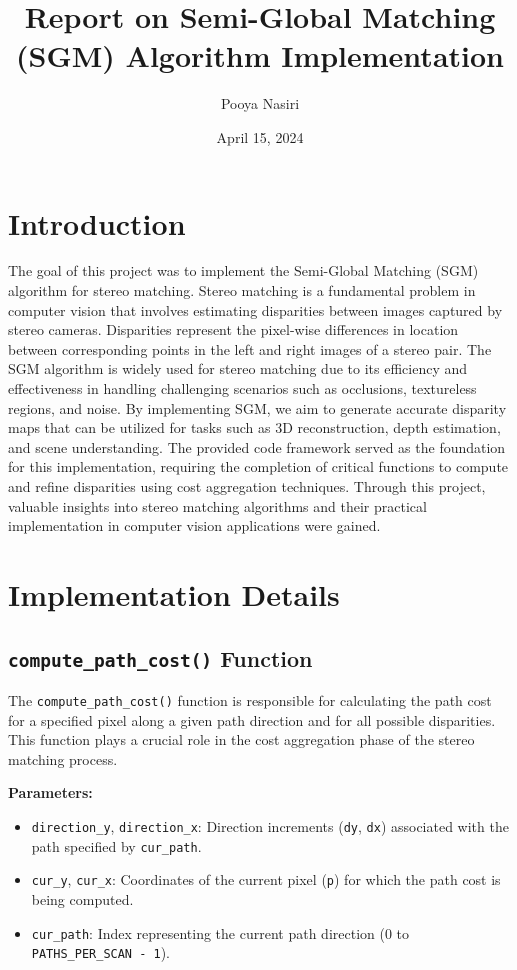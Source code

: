 \documentclass{article}
\begin{document}
\title{Report on Semi-Global Matching (SGM) Algorithm Implementation}
\author{Pooya Nasiri}
\date{April 15, 2024}

\maketitle

\section{Introduction}
The goal of this project was to implement the Semi-Global Matching (SGM) algorithm for stereo matching. Stereo matching is a fundamental problem in computer vision that involves estimating disparities between images captured by stereo cameras. Disparities represent the pixel-wise differences in location between corresponding points in the left and right images of a stereo pair.
The SGM algorithm is widely used for stereo matching due to its efficiency and effectiveness in handling challenging scenarios such as occlusions, textureless regions, and noise. By implementing SGM, we aim to generate accurate disparity maps that can be utilized for tasks such as 3D reconstruction, depth estimation, and scene understanding.
The provided code framework served as the foundation for this implementation, requiring the completion of critical functions to compute and refine disparities using cost aggregation techniques. Through this project, valuable insights into stereo matching algorithms and their practical implementation in computer vision applications were gained.

\section{Implementation Details}
\subsection{\texttt{compute\_path\_cost()} Function}

The \texttt{compute\_path\_cost()} function is responsible for calculating the path cost for a specified pixel along a given path direction and for all possible disparities. This function plays a crucial role in the cost aggregation phase of the stereo matching process.

\textbf{Parameters:}
\begin{itemize}
    \item \texttt{direction\_y}, \texttt{direction\_x}: Direction increments (\texttt{dy}, \texttt{dx}) associated with the path specified by \texttt{cur\_path}.
    \item \texttt{cur\_y}, \texttt{cur\_x}: Coordinates of the current pixel (\texttt{p}) for which the path cost is being computed.
    \item \texttt{cur\_path}: Index representing the current path direction (0 to \texttt{PATHS\_PER\_SCAN - 1}).
\end{itemize}
\end{document}
